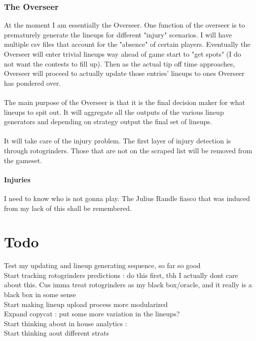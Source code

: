 \documentclass[11pt, oneside]{book}   	%
\begin{document}
\subsection{The Overseer}
At the moment I am essentially the Overseer. One function of the overseer is to prematurely generate the lineups for different "injury" scenarios. I will have multiple csv files that account for the "absence" of certain players. Eventually the Overseer will enter trivial lineups way ahead of game start to "get spots" (I do not want the contests to fill up). Then as the actual tip off time approaches, Overseer will proceed to actually update those entries' lineups to ones Overseer has pondered over. \\
\\
The main purpose of the Overseer is that it is the final decision maker for what lineups to spit out. It will aggregate all the outputs of the various lineup generators and depending on strategy output the final set of lineups.\\
\\
It will take care of the injury problem. The first layer of injury detection is through rotogrinders. Those that are not on the scraped list will be removed from the gameset.
\\
\subsubsection{Injuries}
I need to know who is not gonna play. The Julius Randle fiasco that was induced from my lack of this shall be remembered. 



\chapter{Todo}
Test my updating and lineup generating sequence, so far so good\\

Start tracking rotogrinders predictions : do this first, tbh I actually dont care about this. Cus imma treat rotogrinders as my black box/oracle, and it really is a black box in some sense\\

Start making lineup upload process more modularized\\

Expand copycat : put some more variation in the lineups?\\

Start thinking about in house analytics : \\
Start thinking aout different strats\\
\end{document}
